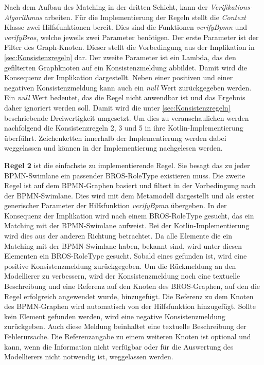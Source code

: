 Nach dem Aufbau des Matching in der dritten Schicht, kann der \emph{Verifikations-Algorithmus} arbeiten.
Für die Implementierung der Regeln stellt die \emph{Context} Klasse zwei Hilfsfunktionen bereit.
Dies sind die Funktionen \emph{verifyBpmn} und \emph{verifyBros}, welche jeweils zwei Parameter benötigen.
Der erste Parameter ist der Filter des Graph-Knoten.
Dieser stellt die Vorbedingung aus der Implikation in \cref{sec:Konsistenzregeln} dar.
Der zweite Parameter ist ein Lambda, das den gefilterten Graphknoten auf ein Konsistenzmeldung abbildet.
Damit wird die Konsequenz der Implikation dargestellt.
Neben einer positiven und einer negativen Konsistenzmeldung kann auch ein \emph{null} Wert zurückgegeben werden.
Ein \emph{null} Wert bedeutet, das die Regel nicht anwendbar ist und das Ergebnis daher ignoriert werden soll.
Damit wird die unter \cref{sec:Konsistenzregeln} beschriebende Dreiwertigkeit umgesetzt.
Um dies zu veranschaulichen werden nachfolgend die Konsistenzregeln 2, 3 und 5 in ihre Kotlin-Implementierung überführt.
Zeichenketten innerhalb der Implementierung werden dabei weggelassen und können in der Implementierung nachgelesen werden.

\textbf{Regel 2} ist die einfachste zu implementierende Regel.
Sie besagt das zu jeder BPMN-Swimlane ein passender BROS-RoleType existieren muss.
Die zweite Regel ist auf dem BPMN-Graphen basiert und filtert in der Vorbedingung nach der BPMN-Swimlane.
Dies wird mit dem Metamodell dargestellt und als erster generischer Parameter der Hilfsfunktion \emph{verifyBpmn} übergeben.
In der Konsequenz der Implikation wird nach einem BROS-RoleType gesucht, das ein Matching mit der BPMN-Swimlane aufweist.
Bei der Kotlin-Implementierung wird dies aus der anderen Richtung betrachtet.
Da alle Elemente die ein Matching mit der BPMN-Swimlane haben, bekannt sind, wird unter diesen Elementen ein BROS-RoleType gesucht.
Sobald eines gefunden ist, wird eine positive Konsistenzmeldung zurückgegeben.
Um die Rückmeldung an den Modellierer zu verbessern, wird der Konsistenzmeldung noch eine textuelle Beschreibung und eine Referenz auf den Knoten des BROS-Graphen, auf den die Regel erfolgreich angewendet wurde, hinzugefügt.
Die Referenz zu dem Knoten des BPMN-Graphen wird automatisch von der Hilfsfunktion hinzugefügt.
Sollte kein Element gefunden werden, wird eine negative Konsistenzmeldung zurückgeben.
Auch diese Meldung beinhaltet eine textuelle Beschreibung der Fehlerursache.
Die Referenzangabe zu einem weiteren Knoten ist optional und kann, wenn die Information nicht verfügbar oder für die Auswertung des Modellierers nicht notwendig ist, weggelassen werden.

